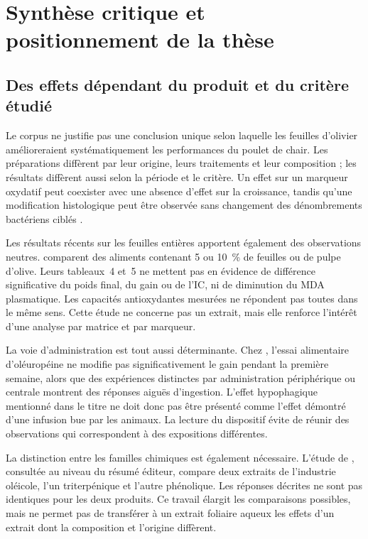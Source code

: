\section{Synthèse critique et positionnement de la thèse}

\subsection{Des effets dépendant du produit et du critère étudié}

Le corpus ne justifie pas une conclusion unique selon laquelle les feuilles d'olivier amélioreraient systématiquement les performances du poulet de chair. Les préparations diffèrent par leur origine, leurs traitements et leur composition ; les résultats diffèrent aussi selon la période et le critère. Un effet sur un marqueur oxydatif peut coexister avec une absence d'effet sur la croissance, tandis qu'une modification histologique peut être observée sans changement des dénombrements bactériens ciblés \citep{Pirman2021,Erener2023,Dias2024}.

Les résultats récents sur les feuilles entières apportent également des observations neutres. \citet{Rezar2025} comparent des aliments contenant 5 ou 10~\% de feuilles ou de pulpe d'olive. Leurs tableaux~4 et~5 ne mettent pas en évidence de différence significative du poids final, du gain ou de l'IC, ni de diminution du MDA plasmatique. Les capacités antioxydantes mesurées ne répondent pas toutes dans le même sens. Cette étude ne concerne pas un extrait, mais elle renforce l'intérêt d'une analyse par matrice et par marqueur.

La voie d'administration est tout aussi déterminante. Chez \citet{Sulaiman2024}, l'essai alimentaire d'oléuropéine ne modifie pas significativement le gain pendant la première semaine, alors que des expériences distinctes par administration périphérique ou centrale montrent des réponses aiguës d'ingestion. L'effet hypophagique mentionné dans le titre ne doit donc pas être présenté comme l'effet démontré d'une infusion bue par les animaux. La lecture du dispositif évite de réunir des observations qui correspondent à des expositions différentes.

La distinction entre les familles chimiques est également nécessaire. L'étude de \citet{Anover2024}, consultée au niveau du résumé éditeur, compare deux extraits de l'industrie oléicole, l'un triterpénique et l'autre phénolique. Les réponses décrites ne sont pas identiques pour les deux produits. Ce travail élargit les comparaisons possibles, mais ne permet pas de transférer à un extrait foliaire aqueux les effets d'un extrait dont la composition et l'origine diffèrent.

